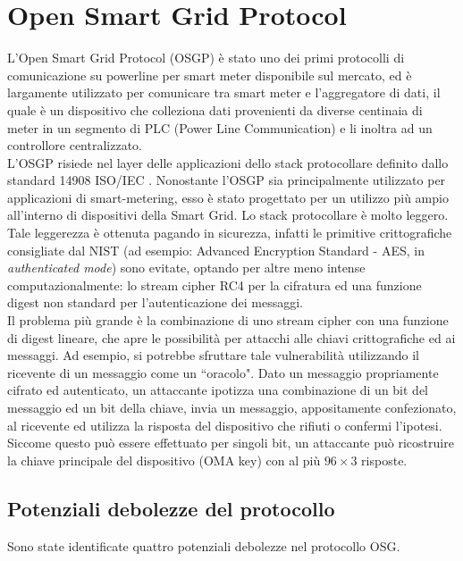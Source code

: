\section{Open Smart Grid Protocol}
L'Open Smart Grid Protocol (OSGP) è stato uno dei primi protocolli di comunicazione su powerline per smart meter disponibile sul mercato, ed è largamente utilizzato per comunicare tra smart meter e l'aggregatore di dati, il quale è un dispositivo che colleziona dati provenienti da diverse centinaia di meter in un segmento di PLC (Power Line Communication) e li inoltra ad un controllore centralizzato.\\
L'OSGP risiede nel layer delle applicazioni dello stack protocollare definito dallo standard 14908 ISO/IEC \cite{standard14908}. Nonostante l'OSGP sia principalmente utilizzato per applicazioni di smart-metering, esso è stato progettato per un utilizzo più ampio all'interno di dispositivi della Smart Grid. Lo stack protocollare è molto leggero. Tale leggerezza è ottenuta pagando in sicurezza, infatti le primitive crittografiche consigliate dal NIST  (ad esempio: Advanced Encryption Standard - AES, in \emph{authenticated mode}) sono evitate, optando per altre meno intense computazionalmente: lo stream cipher RC4 per la cifratura ed una funzione digest non standard per l'autenticazione dei messaggi.\\
Il problema più grande è la combinazione di uno stream cipher con una funzione di digest lineare, che apre le possibilità per attacchi alle chiavi crittografiche ed ai messaggi. Ad esempio, si potrebbe sfruttare tale vulnerabilità utilizzando il ricevente di un messaggio come un ``oracolo". Dato un messaggio propriamente cifrato ed autenticato, un attaccante ipotizza una combinazione di un bit del messaggio ed un bit della chiave, invia un messaggio, appositamente confezionato, al ricevente ed utilizza la risposta del  dispositivo che rifiuti o confermi l'ipotesi. Siccome questo può essere effettuato per singoli bit, un attaccante può ricostruire la chiave principale del dispositivo (OMA key) con al più $96 \times 3$ risposte.
\subsection{Potenziali debolezze del protocollo}
Sono state identificate quattro potenziali debolezze nel protocollo OSG.
